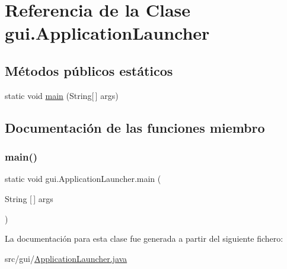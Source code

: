 \hypertarget{classgui_1_1_application_launcher}{}\section{Referencia de la Clase gui.\+Application\+Launcher}
\label{classgui_1_1_application_launcher}
\subsection*{Métodos públicos estáticos}
\begin{DoxyCompactItemize}
\item 
static void \mbox{\hyperlink{classgui_1_1_application_launcher_a4d18ca6d7262e81ed5e5746dae2de30a}{main}} (String\mbox{[}$\,$\mbox{]} args)
\end{DoxyCompactItemize}


\subsection{Documentación de las funciones miembro}
\mbox{\label{classgui_1_1_application_launcher_a4d18ca6d7262e81ed5e5746dae2de30a}} 
\subsubsection{\texorpdfstring{main()}{main()}}
{\footnotesize\ttfamily static void gui.\+Application\+Launcher.\+main (\begin{DoxyParamCaption}\item[{String \mbox{[}$\,$\mbox{]}}]{args }\end{DoxyParamCaption})\hspace{0.3cm}{\ttfamily [static]}}



La documentación para esta clase fue generada a partir del siguiente fichero\+:\begin{DoxyCompactItemize}
\item 
src/gui/\mbox{\hyperlink{_application_launcher_8java}{Application\+Launcher.\+java}}\end{DoxyCompactItemize}
